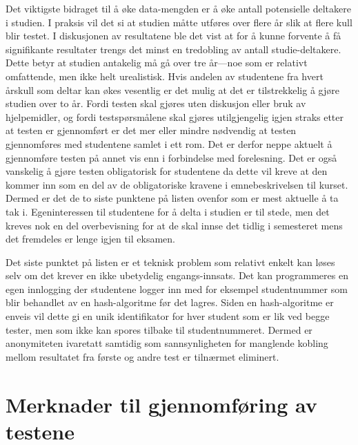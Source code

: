 \documentclass[a4paper,norsk,12pt]{report}
\begin{document}
Det viktigste bidraget til å øke data-mengden er å øke antall potensielle deltakere i studien. I praksis vil det si at studien måtte utføres over flere år slik at flere kull blir testet. I diskusjonen av resultatene ble det vist at for å kunne forvente å få signifikante resultater trengs det minst en tredobling av antall studie-deltakere. Dette betyr at studien antakelig må gå over tre år---noe som er relativt omfattende, men ikke helt urealistisk. Hvis andelen av studentene fra hvert årskull som deltar kan økes vesentlig er det mulig at det er tilstrekkelig å gjøre studien over to år. Fordi testen skal gjøres uten diskusjon eller bruk av hjelpemidler, og fordi testspørsmålene skal gjøres utilgjengelig igjen straks etter at testen er gjennomført er det mer eller mindre nødvendig at testen gjennomføres med studentene samlet i ett rom. Det er derfor neppe aktuelt å gjennomføre testen på annet vis enn i forbindelse med forelesning. Det er også vanskelig å gjøre testen obligatorisk for studentene da dette vil kreve at den kommer inn som en del av de obligatoriske kravene i emnebeskrivelsen til kurset. Dermed er det de to siste punktene på listen ovenfor som er mest aktuelle å ta tak i. Egeninteressen til studentene for å delta i studien er til stede, men det kreves nok en del overbevisning for at de skal innse det tidlig i semesteret mens det fremdeles er lenge igjen til eksamen. 

Det siste punktet på listen er et teknisk problem som relativt enkelt kan løses selv om det krever en ikke ubetydelig engangs-innsats. Det kan programmeres en egen innlogging der studentene logger inn med for eksempel studentnummer som blir behandlet av en hash-algoritme før det lagres. Siden en hash-algoritme er enveis vil dette gi en unik identifikator for hver student som er lik ved begge tester, men som ikke kan spores tilbake til studentnummeret. Dermed er anonymiteten ivaretatt samtidig som sannsynligheten for manglende kobling mellom resultatet fra første og andre test er tilnærmet eliminert.

\appendix
\chapter{Merknader til gjennomføring av testene}



\end{document}
